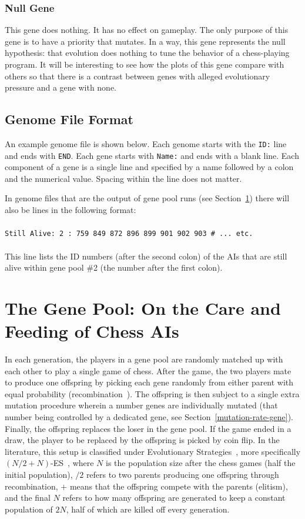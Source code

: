 \documentclass[letterpaper]{article}
\renewcommand{\_}{\allowbreak\textunderscore\allowbreak}
\begin{document}
\subsubsection{Null Gene}
This gene does nothing. It has no effect on gameplay. The only purpose of this gene is to have a priority that mutates. In a way, this gene represents the null hypothesis: that evolution does nothing to tune the behavior of a chess-playing program. It will be interesting to see how the plots of this gene compare with others so that there is a contrast between genes with alleged evolutionary pressure and a gene with none.


\subsection{Genome File Format}
An example genome file is shown below. Each genome starts with the \verb|ID:| line and ends with \verb|END|. Each gene starts with \verb|Name:| and ends with a blank line. Each component of a gene is a single line and specified by a name followed by a colon and the numerical value. Spacing within the line does not matter.


In genome files that are the output of gene pool runs (see Section~\ref{gene-pool-section}) there will also be lines in the following format:\\\\
\verb|Still Alive: 2 : 759 849 872 896 899 901 902 903 # ... etc.|\\\\
This line lists the ID numbers (after the second colon) of the AIs that are still alive within gene pool \#2 (the number after the first colon).

\section{The Gene Pool: On the Care and Feeding of Chess AIs}\label{gene-pool-section}
In each generation, the players in a gene pool are randomly matched up with each other to play a single game of chess. After the game, the two players mate to produce one offspring by picking each gene randomly from either parent with equal probability (recombination~\cite{recombination-wiki}). The offspring is then subject to a single extra mutation procedure wherein a number genes are individually mutated (that number being controlled by a dedicated gene, see Section~\ref{mutation-rate-gene}). Finally, the offspring replaces the loser in the gene pool. If the game ended in a draw, the player to be replaced by the offspring is picked by coin flip. In the literature, this setup is classified under Evolutionary Strategies~\cite{evolution-strategy-wiki}, more specifically \((N/2+N)\)-ES~\cite{evolution-strategy-glossary}, where \(N\) is the population size after the chess games (half the initial population), \(/2\) refers to two parents producing one offspring through recombination, \(+\) means that the offspring compete with the parents (elitism), and the final \(N\) refers to how many offspring are generated to keep a constant population of \(2N\), half of which are killed off every generation.
\end{document}
